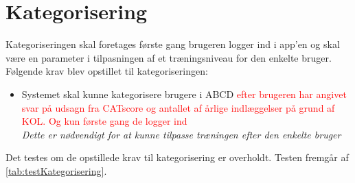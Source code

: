 \section{Kategorisering}
Kategoriseringen skal foretages første gang brugeren logger ind i app'en og skal være en parameter i tilpasningen af et træningsniveau for den enkelte bruger. Følgende krav blev opstillet til kategoriseringen:

\begin{itemize}
\item Systemet skal kunne kategorisere brugere i ABCD \textcolor{red}{efter brugeren har angivet svar på udsagn fra CATscore og antallet af årlige indlæggelser på grund af KOL. Og kun første gang de logger ind}
\\
\textit{Dette er nødvendigt for at kunne tilpasse træningen efter den enkelte bruger}
\end{itemize}

\noindent
Det testes om de opstillede krav til kategorisering er overholdt. Testen fremgår af \autoref{tab:testKategorisering}.

